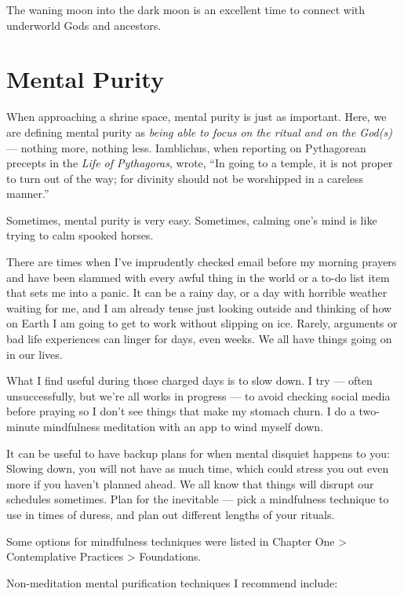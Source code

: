 \documentclass[
]{book}
\begin{document}
The waning moon into the dark moon is an excellent time to connect with underworld Gods and ancestors.

\hypertarget{mental-purity}{%
\section{Mental Purity}\label{mental-purity}}

When approaching a shrine space, mental purity is just as important. Here, we are defining mental purity as \emph{being able to focus on the ritual and on the God(s)} --- nothing more, nothing less. Iamblichus, when reporting on Pythagorean precepts in the \emph{Life of Pythagoras}, wrote, ``In going to a temple, it is not proper to turn out of the way; for divinity should not be worshipped in a careless manner.''

Sometimes, mental purity is very easy. Sometimes, calming one's mind is like trying to calm spooked horses.

There are times when I've imprudently checked email before my morning prayers and have been slammed with every awful thing in the world or a to-do list item that sets me into a panic. It can be a rainy day, or a day with horrible weather waiting for me, and I am already tense just looking outside and thinking of how on Earth I am going to get to work without slipping on ice. Rarely, arguments or bad life experiences can linger for days, even weeks. We all have things going on in our lives.

What I find useful during those charged days is to slow down. I try --- often unsuccessfully, but we're all works in progress --- to avoid checking social media before praying so I don't see things that make my stomach churn. I do a two-minute mindfulness meditation with an app to wind myself down.

It can be useful to have backup plans for when mental disquiet happens to you: Slowing down, you will not have as much time, which could stress you out even more if you haven't planned ahead. We all know that things will disrupt our schedules sometimes. Plan for the inevitable --- pick a mindfulness technique to use in times of duress, and plan out different lengths of your rituals.

Some options for mindfulness techniques were listed in Chapter One \textgreater{} Contemplative Practices \textgreater{} Foundations.

Non-meditation mental purification techniques I recommend include:
\end{document}
